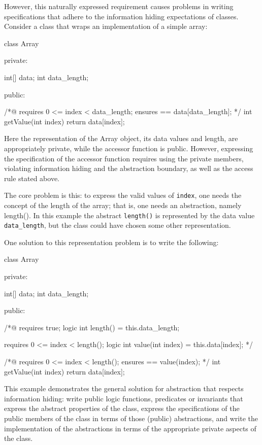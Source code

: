 However, this naturally expressed requirement causes problems in writing specifications that adhere to the information hiding expectations of classes. Consider a class that wraps an implementation of a simple array:

\begin{listing-nonumber}
class Array {
	
  private:
	
	int[] data;
	int data_length;

  public:
	
	/*@ 
	requires 0 <= index < data_length;
	ensures \result == data[data_length];
	*/
	int getValue(int index) {
		return data[index];
	}
}
\end{listing-nonumber}

Here the representation of the Array object, its data values and length, are appropriately private, while the accessor function is public.
However, expressing the specification of the accessor function requires using the private members, violating information hiding and
the abstraction boundary, as well as the access rule stated above.

The core problem is this: to express the valid values of \lstinline|index|, one needs the concept of the length of the array; that is, one needs an abstraction, namely length(). In this example the abstract \lstinline|length()| is represented by the data value \lstinline|data_length|, but the class could have chosen some other representation.

One solution to this representation problem is to write the following:

\begin{listing-nonumber}
class Array {
	
  private:
	
	int[] data;
	int data_length;
	
  public:
	
	/*@
	   requires true;
	   logic int length() = this.data_length; 
	   
	   requires 0 <= index < length();
	   logic int value(int index) = this.data[index];
	*/
	
	/*@ 
	   requires 0 <= index < length();
	   ensures \result == value(index);
	*/
	int getValue(int index) {
		return data[index];
	}
}
\end{listing-nonumber}

This example demonstrates the general solution for abstraction that respects information hiding: write public logic functions, predicates or invariants that express the abstract properties of the class, express the specifications of the public members of the class in terms of those (public) abstractions, and write the implementation of the abstractions in terms of the appropriate private aspects of the class.

